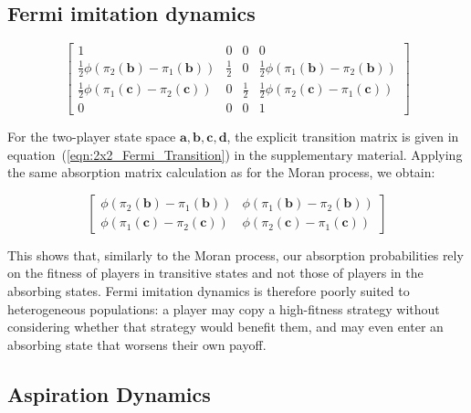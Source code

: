 \documentclass{article}
\begin{document}
\subsection*{Fermi imitation dynamics}
\begin{center}
\begin{equation}
\begin{bmatrix}
1 & 0 & 0 & 0\\
\frac{1}{2}\phi(\pi_2(\mathbf{b}) - \pi_1(\mathbf{b})) &
\frac{1}{2} &
0 &
\frac{1}{2}\phi(\pi_1(\mathbf{b}) - \pi_2(\mathbf{b}))\\
\frac{1}{2}\phi(\pi_1(\mathbf{c}) - \pi_2(\mathbf{c})) &
0 &
\frac{1}{2} &
\frac{1}{2}\phi(\pi_2(\mathbf{c}) - \pi_1(\mathbf{c}))\\
0 & 0 & 0 & 1
\end{bmatrix}
\label{eqn:2x2_Fermi_Transition}
\end{equation}
\end{center}

For the two-player state space \(\mathbf{a},\mathbf{b},\mathbf{c},\mathbf{d}\),
the explicit transition matrix is given in
equation~(\ref{eqn:2x2_Fermi_Transition}) in the supplementary material.
Applying the same absorption matrix calculation as for the Moran process, we
obtain:

\begin{equation}
    \begin{bmatrix}
        \phi(\pi_2(\textbf{b}) - \pi_1(\textbf{b})) & \phi(\pi_1(\textbf{b})-\pi_2(\textbf{b}))\\\phi(\pi_1(\textbf{c}) - \pi_2(\textbf{c})) & \phi(\pi_2(\textbf{c}) - \pi_1(\textbf{c}))
    \end{bmatrix}
\end{equation}

This shows that, similarly to the Moran process, our absorption probabilities
rely on the fitness of players in transitive states and not those of players in
the absorbing states.
Fermi imitation dynamics is therefore poorly suited to heterogeneous
populations: a player may copy a high-fitness strategy without considering
whether that strategy would benefit them, and may even enter an absorbing state
that worsens their own payoff.

\subsection*{Aspiration Dynamics}
\end{document}
